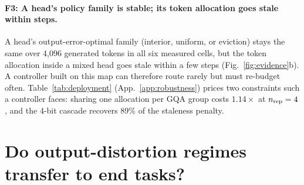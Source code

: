 \documentclass{article}
\theoremstyle{definition}
\begin{document}
\paragraph{F3: A head's policy family is stable; its token allocation goes stale within steps.}
A head's output-error-optimal family (interior, uniform, or eviction) stays the same over 4,096 generated tokens in all six measured cells, but the token allocation inside a mixed head goes stale within a few steps (Fig.~\ref{fig:evidence}b).  A controller built on this map can therefore route rarely but must re-budget often.  Table~\ref{tab:deployment} (App.~\ref{app:robustness}) prices two constraints such a controller faces: sharing one allocation per GQA group costs $1.14\times$ at $n_{\rm rep}=4$, and the 4-bit cascade recovers 89\% of the staleness penalty.



\section{Do output-distortion regimes transfer to end tasks?}
\label{sec:endtask}
\end{document}
